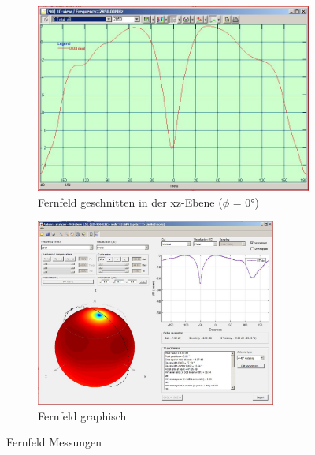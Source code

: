 \begin{figure}[htbp]
	\begin{center}
		\begin{subfigure}[t]{0.49\textwidth}
			\begin{center}
				\includegraphics[width=\textwidth]{pic/Messungen/Messung_Farfield.JPG}
				\caption{Fernfeld geschnitten in der xz-Ebene ($\phi$ = 0°)}
				\label{fig:Mess_Farfield_dia}
			\end{center}
		\end{subfigure}
		\begin{subfigure}[t]{0.49\textwidth}
			\begin{center}
				\includegraphics[width=0.87\textwidth]{pic/Messungen/Overview_sphare.JPG}
				\caption{Fernfeld graphisch}
				\label{fig:Mess_Farfield_graph}
			\end{center}
		\end{subfigure}
		\caption{Fernfeld Messungen}
		\label{fig:Messungen_Fernfeld}
	\end{center}
\end{figure}

